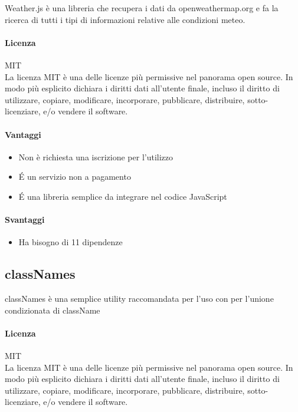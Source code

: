 Weather.js è una libreria che recupera i dati da openweathermap.org e
fa la ricerca di tutti i tipi di informazioni relative alle condizioni
meteo. 

\paragraph{Licenza} MIT \\
La licenza MIT è una delle licenze più permissive nel panorama open
source. In modo più esplicito dichiara i diritti dati all'utente
finale, incluso il diritto di utilizzare, copiare, modificare,
incorporare, pubblicare, distribuire, sotto-licenziare, e/o vendere il
software. \\

\paragraph{Vantaggi}
\begin{itemize}
	\item Non è richiesta una iscrizione per l'utilizzo
	\item \'E un servizio non a pagamento
	\item \'E una libreria semplice da integrare nel codice JavaScript
\end{itemize}

\paragraph{Svantaggi} 
\begin{itemize}
	\item Ha bisogno di 11 dipendenze 
\end{itemize}


\subsection{classNames}

classNames è una semplice utility raccomandata per l'uso con  per l'unione condizionata di className

\paragraph{Licenza} MIT \\
La licenza MIT è una delle licenze più permissive nel panorama open
source. In modo più esplicito dichiara i diritti dati all'utente
finale, incluso il diritto di utilizzare, copiare, modificare,
incorporare, pubblicare, distribuire, sotto-licenziare, e/o vendere il
software. 
\\

